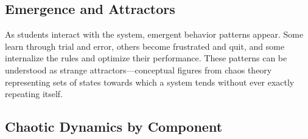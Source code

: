 \documentclass{article}
\begin{document}
\subsection*{Emergence and Attractors}

As students interact with the system, emergent behavior patterns appear.
Some learn through trial and error, others become frustrated and quit, and 
some internalize the rules and optimize their performance. These patterns 
can be understood as strange attractors—conceptual figures from chaos 
theory representing sets of states towards which a system tends without 
ever exactly repeating itself.

\subsection*{Chaotic Dynamics by Component}
\end{document}
